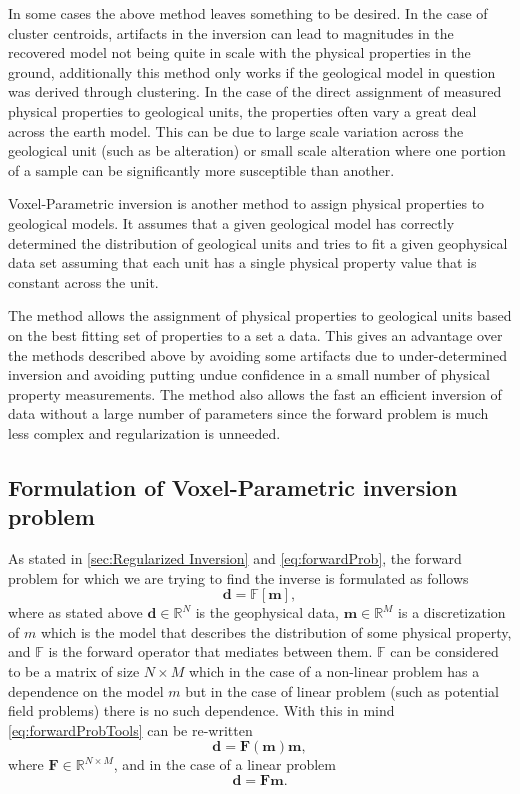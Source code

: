 In some cases the above method leaves something to be desired. In the case of cluster centroids, artifacts in the inversion can lead to magnitudes in the recovered model not being quite in scale with the physical properties in the ground, additionally this method only works if the geological model in question was derived through clustering. In the case of the direct assignment of measured physical properties to geological units, the properties often vary a great deal across the earth model. This can be due to large scale variation across the geological unit (such as be alteration) or small scale alteration where one portion of a sample can be significantly more susceptible than another.

Voxel-Parametric inversion is another method to assign physical properties to geological models. It assumes that a given geological model has correctly determined the distribution of geological units and tries to fit a given geophysical data set assuming that each unit has a single physical property value that is constant across the unit. 

The method allows the assignment of physical properties to geological units based on the best fitting set of properties to a set a data. This gives an advantage over the methods described above by avoiding some artifacts due to under-determined inversion and avoiding putting undue confidence in a small number of physical property measurements. The method also allows the fast an efficient inversion of data without a large number of parameters since the forward problem is much less complex and regularization is unneeded.

\subsection{Formulation of Voxel-Parametric inversion problem}
\label{subsec:voxelParamFormulation}

As stated in \autoref{sec:Regularized Inversion} and \autoref{eq:forwardProb}, the forward problem for which we are trying to find the inverse is formulated as follows
\begin{equation}
\mathbf d = \mathbb F [\mathbf m], \label{eq:forwardProbTools}
\end{equation}
where as stated above $\mathbf d \in \mathbb R^N$ is the geophysical data, $\mathbf m \in \mathbb R^M$ is a discretization of $m$ which is the model that describes the distribution of some physical property, and $\mathbb F$ is the forward operator that mediates between them. $\mathbb F$ can be considered to be a matrix of size $N\times M$ which in the case of a non-linear problem has a dependence on the model $m$ but in the case of linear problem (such as potential field problems) there is no such dependence. With this in mind \autoref{eq:forwardProbTools} can be re-written
\begin{equation}
\mathbf d = \mathbf F(\mathbf m)\mathbf m, \label{eq:forwardProbMat}
\end{equation}
where $\mathbf F \in \mathbb R^{N\times M}$, and in the case of a linear problem
\begin{equation}
\mathbf d = \mathbf F\mathbf m. \label{eq:forwardProbMatLin}
\end{equation}

